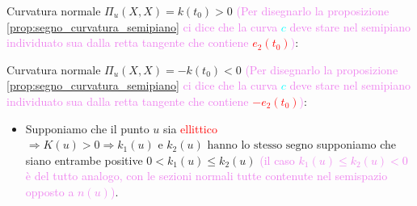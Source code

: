 \begin{osservazione}
        Curvatura normale $\Pi_{u}(X,X) = k(t_0) > 0$ \textcolor{violet}{(Per disegnarlo la proposizione \ref{prop:segno_curvatura_semipiano} ci dice 
        che la curva \textcolor{cyan}{$c$} deve stare nel semipiano individuato sua dalla retta tangente che contiene \textcolor{red}{$e_2(t_0)$})}:
        \begin{center}
        \end{center}
        Curvatura normale $\Pi_{u}(X,X) = -k(t_0) < 0$ \textcolor{violet}{(Per disegnarlo la proposizione \ref{prop:segno_curvatura_semipiano} ci dice 
        che la curva \textcolor{cyan}{$c$} deve stare nel semipiano individuato sua dalla retta tangente che contiene \textcolor{red}{$-e_2(t_0)$})}:
        \begin{center}
        \end{center}
        \begin{itemize}
            \item Supponiamo che il punto $u$ sia \textcolor{red}{ellittico} $\Rightarrow 
            K(u) > 0 \Rightarrow k_1(u) \text{ e } k_2(u) \text{ hanno lo stesso segno}$
            supponiamo che siano entrambe positive $0 < k_1(u) \le k_2(u)$ \textcolor{violet}{(il caso $k_1(u) \le k_2(u) < 0$ è del tutto analogo, con le sezioni normali tutte contenute nel semispazio opposto a $n(u)$)}.
        

\end{itemize}
\end{osservazione}
